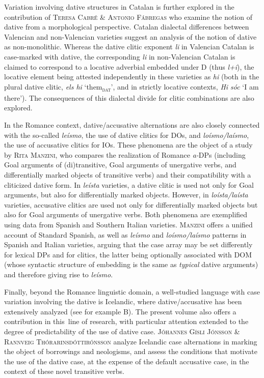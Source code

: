 \documentclass[output=paper,modfonts,nonflat,colorlinks,citecolor=brown]{langsci/langscibook}
\begin{document}
Variation involving dative structures in Catalan is further explored in  the contribution of {\textsc{Teresa Cabré \& Antonio Fábregas}} who examine the notion of dative from a morphological perspective. Catalan dialectal differences between Valencian and non-Valencian varieties suggest an analysis of the notion of dative as non-monolithic. Whereas the dative clitic exponent {\textit{li}} in Valencian Catalan is case-marked with dative, the corresponding {\textit{li}} in non-Valencian Catalan is claimed to correspond to a locative adverbial embedded under D (thus {\textit{l+i}}), the locative element being attested independently in these varieties as {\textit{hi}} (both in the plural dative clitic, {\textit{els hi}} ‘them{\textsc{\textsubscript{dat}}}’, and in strictly locative contexts, {\textit{Hi sóc}} ‘I am there’). The consequences of this dialectal divide for clitic combinations are also explored.



In the Romance context, dative/accusative alternations are also closely connected with the so-called {\textit{leísmo}}, the use of dative clitics for DOs, and {\textit{loísmo/laísmo}}, the use of accusative clitics for IOs. These phenomena are the object of a study by {\textsc{Rita Manzini,} who} compares the realization of Romance {\textit{a-}}DPs (including Goal arguments of (di)transitive, Goal arguments of unergative verbs, and differentially marked objects of transitive verbs) and their compatibility with a cliticized dative form. In {\textit{leísta}} varieties, a dative clitic is used not only for Goal arguments, but also for differentially marked objects. However, in {\textit{loísta/laísta}} varieties, accusative clitics are used not only for differentially marked objects but also for Goal arguments of unergative verbs. Both phenomena are exemplified using data from Spanish and Southern Italian varieties. {\textsc{Manzini}} offers a unified account of Standard Spanish, as well as {\textit{leísmo}} and {\textit{loísmo/laísmo}} patterns in Spanish and Italian varieties, arguing that the case array may be set differently for lexical DPs and for clitics, the latter being optionally associated with DOM (whose syntactic structure of embedding is the same as {\textit{typical}} dative arguments) and therefore giving rise to {\textit{leísmo}}.



Finally, beyond the Romance linguistic domain, a well-studied language with case variation involving the dative is Icelandic, where dative/accusative has been extensively analyzed (see for example B\citealt{Barðdal2001, Barðdal2008,Svenonius2002,Maling2002,JónssonEythórsson2005}). The present volume also offers a contribution in this~line of research, with particular attention extended to the degree of predictability of the use of dative case. {\textsc{Jóhannes Gísli Jónsson \& Rannveig Thórarinsdóttirónsson}} analyze Icelandic case alternations in marking the object of borrowings and neologisms, and assess the conditions that motivate the use of the dative case, at the expense of the default accusative case, in the context of these novel transitive verbs.  
 

\sloppy\printbibliography[heading=subbibliography,notkeyword=this]
\end{document}
